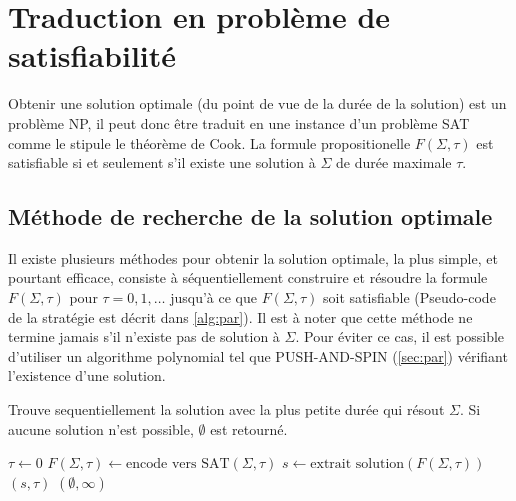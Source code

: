 \documentclass[french, 12pt, letterpaper]{article}
\theoremstyle{definition}
\theoremstyle{proposition}
\theoremstyle{example}
\begin{document}
    \newpage
    \section{Traduction en problème de satisfiabilité}

    Obtenir une solution optimale (du point de vue de la durée de la solution) est un problème NP, il peut donc être traduit en une instance
    d'un problème SAT comme le stipule le théorème de Cook. La formule propositionelle $F(\Sigma, \tau)$ est satisfiable si et seulement s'il existe une solution à $\Sigma$
    de durée maximale $\tau$.

    \subsection{Méthode de recherche de la solution optimale}
    \label{sec:methiter}

    Il existe plusieurs méthodes pour obtenir la solution optimale, la plus simple, et pourtant efficace, consiste à séquentiellement construire
    et résoudre la formule $F(\Sigma, \tau)$ pour $\tau = 0, 1, \ldots$ jusqu'à ce que $F(\Sigma, \tau)$ soit satisfiable 
    (Pseudo-code de la stratégie est décrit dans \ref{alg:par}).
    Il est à noter que cette méthode ne termine jamais s'il n'existe pas de solution à $\Sigma$. Pour éviter ce cas, il est possible 
    d'utiliser un algorithme polynomial tel que PUSH-AND-SPIN \cite{PAS} (\ref{sec:par}) vérifiant l'existence d'une solution.

    \begin{algorithm}
        \caption{Trouve sequentiellement la solution avec la plus petite durée qui résout $\Sigma$. 
        Si aucune solution n'est possible, $\emptyset$ est retourné.}
        \begin{algorithmic}
            \label{alg:par}
                \STATE $\tau \leftarrow 0$
                \LOOP
                    \STATE $F(\Sigma, \tau) \leftarrow \text{encode vers SAT}(\Sigma, \tau)$
                        \STATE $s \leftarrow \text{extrait solution}(F(\Sigma, \tau))$
                        \RETURN $( s, \tau )$ 
                    \ENDIF
                \ENDLOOP
            \ELSE
                \RETURN $( \emptyset, \infty )$ 
            \ENDIF
        \end{algorithmic}
    \end{algorithm}
        
\end{document}
